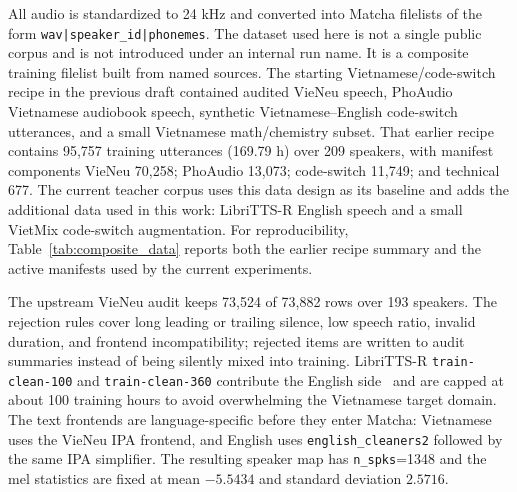 \documentclass[10pt,twoside]{article}
\begin{document}
All audio is standardized to 24 kHz and converted into Matcha filelists of the
form \texttt{wav|speaker\_id|phonemes}. The dataset used here is not a single
public corpus and is not introduced under an internal run name. It is a
composite training filelist built from named sources. The starting
Vietnamese/code-switch recipe in the previous draft contained audited VieNeu
speech, PhoAudio Vietnamese audiobook speech, synthetic Vietnamese--English
code-switch utterances, and a small Vietnamese math/chemistry subset. That
earlier recipe contains 95,757 training utterances (169.79 h) over 209 speakers,
with manifest components VieNeu 70,258; PhoAudio 13,073; code-switch 11,749; and
technical 677. The current teacher corpus uses this data design as its baseline
and adds the additional data used in this work: LibriTTS-R English speech and a
small VietMix code-switch augmentation. For reproducibility,
Table~\ref{tab:composite_data}
reports both the earlier recipe summary and the active manifests used by the
current experiments.

The upstream VieNeu audit keeps 73,524 of 73,882 rows over 193 speakers. The
rejection rules cover long leading or trailing silence, low speech ratio,
invalid duration, and frontend incompatibility; rejected items are written to
audit summaries instead of being silently mixed into training. LibriTTS-R
\texttt{train-clean-100} and \texttt{train-clean-360} contribute the English
side~\cite{libritts,librittsr} and are capped at about 100 training hours to
avoid overwhelming the Vietnamese target domain. The text frontends are
language-specific before they enter Matcha: Vietnamese uses the VieNeu IPA
frontend, and English uses
\texttt{english\_cleaners2} followed by the same IPA simplifier. The resulting
speaker map has \texttt{n\_spks}=1348 and the mel statistics are fixed at mean
$-5.5434$ and standard deviation $2.5716$.
\end{document}
